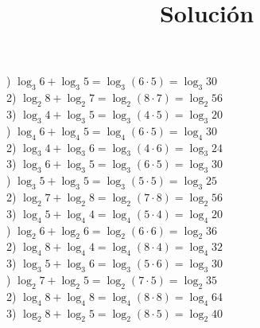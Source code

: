 \documentclass[a4paper,12pt]{article}
\title{Solución}
\author{}
\date{}
\begin{document}
) $\log_3{6}+\log_3{5}=\log_3{(6\cdot5)}=\log_3{30 }$\vspace{1cm}\\ 
2) $\log_2{8}+\log_2{7}=\log_2{(8\cdot7)}=\log_2{56 }$\vspace{1cm}\\ 
3) $\log_3{4}+\log_3{5}=\log_3{(4\cdot5)}=\log_3{20 }$\vspace{1cm}\\ 

 ) $\log_4{6}+\log_4{5}=\log_4{(6\cdot5)}=\log_4{30 }$\vspace{1cm}\\ 
2) $\log_3{4}+\log_3{6}=\log_3{(4\cdot6)}=\log_3{24 }$\vspace{1cm}\\ 
3) $\log_3{6}+\log_3{5}=\log_3{(6\cdot5)}=\log_3{30 }$\vspace{1cm}\\ 

 ) $\log_3{5}+\log_3{5}=\log_3{(5\cdot5)}=\log_3{25 }$\vspace{1cm}\\ 
2) $\log_2{7}+\log_2{8}=\log_2{(7\cdot8)}=\log_2{56 }$\vspace{1cm}\\ 
3) $\log_4{5}+\log_4{4}=\log_4{(5\cdot4)}=\log_4{20 }$\vspace{1cm}\\ 

 ) $\log_2{6}+\log_2{6}=\log_2{(6\cdot6)}=\log_2{36 }$\vspace{1cm}\\ 
2) $\log_4{8}+\log_4{4}=\log_4{(8\cdot4)}=\log_4{32 }$\vspace{1cm}\\ 
3) $\log_3{5}+\log_3{6}=\log_3{(5\cdot6)}=\log_3{30 }$\vspace{1cm}\\ 

 ) $\log_2{7}+\log_2{5}=\log_2{(7\cdot5)}=\log_2{35 }$\vspace{1cm}\\ 
2) $\log_4{8}+\log_4{8}=\log_4{(8\cdot8)}=\log_4{64 }$\vspace{1cm}\\ 
3) $\log_2{8}+\log_2{5}=\log_2{(8\cdot5)}=\log_2{40 }$\vspace{1cm}\\ 

 \pagebreak 
\end{document}
